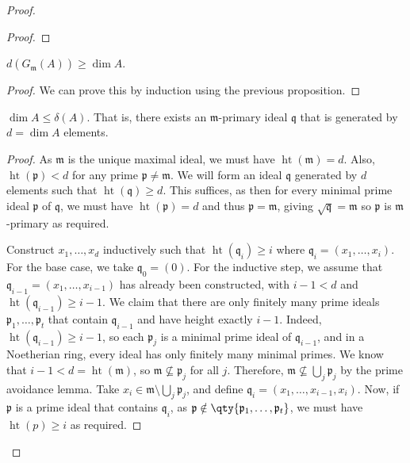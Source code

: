 \begin{proof}
\begin{proof}
    \end{proof}
    \begin{proposition}
        \( d(G_{\mathfrak m}(A)) \geq \dim A \).
    \end{proposition}
    \begin{proof}
        We can prove this by induction using the previous proposition.
    \end{proof}
    \begin{proposition}
        \( \dim A \leq \delta(A) \).
        That is, there exists an \( \mathfrak m \)-primary ideal \( \mathfrak q \) that is generated by \( d = \dim A \) elements.
    \end{proposition}
    \begin{proof}
        As \( \mathfrak m \) is the unique maximal ideal, we must have \( \operatorname{ht}(\mathfrak m) = d \).
        Also, \( \operatorname{ht}(\mathfrak p) < d \) for any prime \( \mathfrak p \neq \mathfrak m \).
        We will form an ideal \( \mathfrak q \) generated by \( d \) elements such that \( \operatorname{ht}(\mathfrak q) \geq d \).
        This suffices, as then for every minimal prime ideal \( \mathfrak p \) of \( \mathfrak q \), we must have \( \operatorname{ht}(\mathfrak p) = d \) and thus \( \mathfrak p = \mathfrak m \), giving \( \sqrt{\mathfrak q} = \mathfrak m \) so \( \mathfrak p \) is \( \mathfrak m \)-primary as required.

        Construct \( x_1, \dots, x_d \) inductively such that \( \operatorname{ht}(\mathfrak q_i) \geq i \) where \( \mathfrak q_i = (x_1, \dots, x_i) \).
        For the base case, we take \( \mathfrak q_0 = (0) \).
        For the inductive step, we assume that \( \mathfrak q_{i-1} = (x_1, \dots, x_{i-1}) \) has already been constructed, with \( i - 1 < d \) and \( \operatorname{ht}(\mathfrak q_{i-1}) \geq i-1 \).
        We claim that there are only finitely many prime ideals \( \mathfrak p_1, \dots, \mathfrak p_t \) that contain \( \mathfrak q_{i-1} \) and have height exactly \( i-1 \).
        Indeed, \( \operatorname{ht}(\mathfrak q_{i-1}) \geq i-1 \), so each \( \mathfrak p_j \) is a minimal prime ideal of \( \mathfrak q_{i-1} \), and in a Noetherian ring, every ideal has only finitely many minimal primes.
        We know that \( i - 1 < d = \operatorname{ht}(\mathfrak m) \), so \( \mathfrak m \nsubseteq \mathfrak p_j \) for all \( j \).
        Therefore, \( \mathfrak m \nsubseteq \bigcup_j \mathfrak p_j \) by the prime avoidance lemma.
        Take \( x_i \in \mathfrak m \setminus \bigcup_j \mathfrak p_j \), and define \( \mathfrak q_i = (x_1, \dots, x_{i-1}, x_i) \).
        Now, if \( \mathfrak p \) is a prime ideal that contains \( \mathfrak q_i \), as \( \mathfrak p \notin \qty{\mathfrak p_1, \dots, \mathfrak p_t} \), we must have \( \operatorname{ht}(p) \geq i \) as required.
    \end{proof}
\end{proof}
